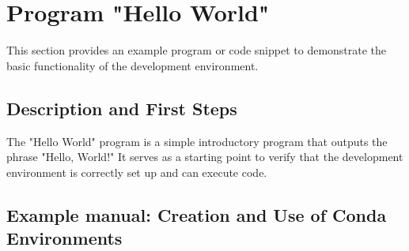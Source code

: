 \section{Program "Hello World"}

This section provides an example program or code snippet to demonstrate the basic functionality of the development environment.

\subsection{Description and First Steps}

The "Hello World" program is a simple introductory program that outputs the phrase "Hello, World!" It serves as a starting point to verify that the development environment is correctly set up and can execute code.


\subsection{Example manual: Creation and Use of Conda Environments}

